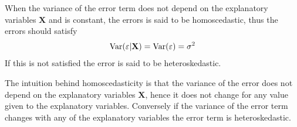 \begin{definition}
When the variance of the error term does not depend on the explanatory variables $\mathbf{X}$ and is constant, the errors is said to be homoscedastic, thus the errors should satisfy
\begin{align*}
    \operatorname{\text{Var}}(\varepsilon | \mathbf{X}) = \operatorname{\text{Var}}(\varepsilon) = \sigma^2
\end{align*}
If this is not satisfied the error is said to be heteroskedastic. 
\end{definition}
The intuition behind homoscedasticity is that the variance of the error does not depend on the explanatory variables $\mathbf{X}$, hence it does not change for any value given to the explanatory variables. Conversely if the variance of the error term changes with any of the explanatory variables the error term is heteroskedastic. 

